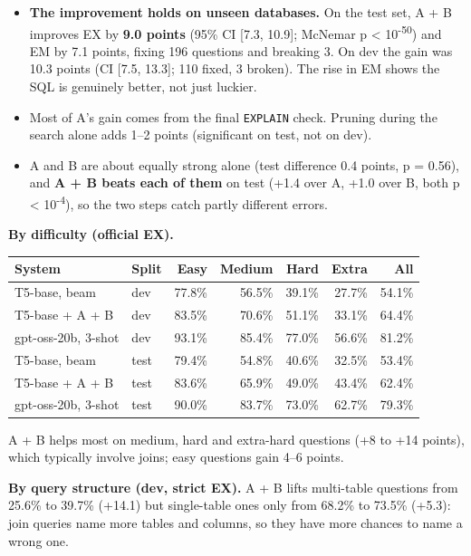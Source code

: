 \documentclass[
  10pt,
]{article}
\newcounter{none} %
\providecommand{\tightlist}{%
  \setlength{\itemsep}{0pt}\setlength{\parskip}{0pt}}
\begin{document}
\begin{itemize}
\tightlist
\item
  \textbf{The improvement holds on unseen databases.} On the test set, A
  + B improves EX by \textbf{9.0 points} (95\% CI {[}7.3, 10.9{]};
  McNemar p \textless{} 10\textsuperscript{-50}) and EM by 7.1 points,
  fixing 196 questions and breaking 3. On dev the gain was 10.3 points
  (CI {[}7.5, 13.3{]}; 110 fixed, 3 broken). The rise in EM shows the
  SQL is genuinely better, not just luckier.
\item
  Most of A's gain comes from the final \texttt{EXPLAIN} check. Pruning
  during the search alone adds 1--2 points (significant on test, not on
  dev).
\item
  A and B are about equally strong alone (test difference 0.4 points, p
  = 0.56), and \textbf{A + B beats each of them} on test (+1.4 over A,
  +1.0 over B, both p \textless{} 10\textsuperscript{-4}), so the two
  steps catch partly different errors.
\end{itemize}

\textbf{By difficulty (official EX).}

{\def\LTcaptype{none} %
\begin{longtable}[]{@{}llrrrrr@{}}
\toprule\noalign{}
System & Split & Easy & Medium & Hard & Extra & All \\
\midrule\noalign{}
\endhead
\bottomrule\noalign{}
\endlastfoot
T5-base, beam & dev & 77.8\% & 56.5\% & 39.1\% & 27.7\% & 54.1\% \\
T5-base + A + B & dev & 83.5\% & 70.6\% & 51.1\% & 33.1\% & 64.4\% \\
gpt-oss-20b, 3-shot & dev & 93.1\% & 85.4\% & 77.0\% & 56.6\% &
81.2\% \\
T5-base, beam & test & 79.4\% & 54.8\% & 40.6\% & 32.5\% & 53.4\% \\
T5-base + A + B & test & 83.6\% & 65.9\% & 49.0\% & 43.4\% & 62.4\% \\
gpt-oss-20b, 3-shot & test & 90.0\% & 83.7\% & 73.0\% & 62.7\% &
79.3\% \\
\end{longtable}
}

A + B helps most on medium, hard and extra-hard questions (+8 to +14
points), which typically involve joins; easy questions gain 4--6 points.

\textbf{By query structure (dev, strict EX).} A + B lifts multi-table
questions from 25.6\% to 39.7\% (+14.1) but single-table ones only from
68.2\% to 73.5\% (+5.3): join queries name more tables and columns, so
they have more chances to name a wrong one.
\end{document}
